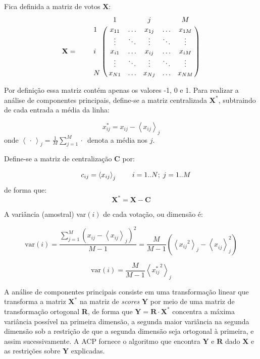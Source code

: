 \documentclass[
	article,			%
	12pt,				%
    twoside,			%
	a4paper,			%
	english,			%
	french,				%
	spanish,			%
	brazil,				%
	]{abntex2}
\newcommand{\tikzmark}[1]{\tikz[overlay, remember picture] \coordinate (#1);}
\let\bbordermatrix\bordermatrix
\begin{document}
Fica definida a matriz de votos $\mathbf{X}$:
\medskip{}
\[
  \mathbf{X} = \qquad \bbordermatrix{~  & \tikzmark{harrowleft} 1 & ~ & j & ~
                        & M\tikzmark{harrowright}  \cr
                    \tikzmark{varrowtop} 
                    1 & x_{11} & \ldots & x_{1j} & \ldots & x_{1M} \cr
                    ~ & \vdots & \ddots & \vdots & \ddots & \vdots \cr
                    i & x_{i1} & \ldots & x_{ij} & \ldots & x_{iM} \cr
                    ~ & \vdots & \ddots & \vdots & \ddots & \vdots \cr
                    \tikzmark{varrowbottom}
                    N & x_{N1} & \ldots & x_{Nj} & \ldots & x_{NM} \cr
                    }
\]

Por definição essa matriz contém apenas os valores -1, 0 e 1. Para realizar a análise de componentes principais, define-se a matriz centralizada $\mathbf{X^{*}}$, subtraindo de cada entrada a média da linha:

\begin{equation}
  x_{ij}^{*} = x_{ij} - \left< x_{ij} \right>_j 
  \label{eq:x-estrela}
\end{equation}
onde $\left< \,\cdot\, \right>_j = \frac{1}{M}\sum_{j=1}^{M} \cdot\,$ denota a média nos $j$.

Define-se a matriz de centralização $\mathbf{C}$ por:

\[
  \begin{array}{r r r r}
    ~ & c_{ij} = \left< x_{ij} \right>_{j} & ~ & i=1..N;\;j=1..M \\
  \end{array}
\]
de forma que:
\[
  \mathbf{X^{*}} = \mathbf{X} - \mathbf{C}
\]

A variância (amostral) var$(i)$ de cada votação, ou dimensão é:

\[
\mathrm{var}(i) = \frac{\sum_{j=1}^M \left( x_{ij} - \left< x_{ij} \right>_j \right)^2 }{M-1}
= \frac{M}{M-1}\left(\left< {x_{ij}}^{2} \right>_{j} - \left< x_{ij}^{~}\right>_{j}^{2} \right)
\]

\begin{equation}
\mathrm{var}(i) = \frac{M}{M-1}\left<{x_{ij}^{*}}^{2}\right>_{j}
\label{eq:variancia}
\end{equation}

A análise de componentes principais consiste em uma transformação linear que transforma a matriz $\mathbf{X^{*}}$ na matriz de \emph{scores} $\mathbf{Y}$ por meio de uma matriz de transformação ortogonal \textbf{R}, de forma que  $\mathbf{Y} = \mathbf{R}\cdot \mathbf{X^{*}}$ concentra a máxima variância possível na primeira dimensão, a segunda maior variância na segunda dimensão sob a restrição de que a segunda dimensão seja ortogonal à primeira, e assim sucessivamente. A ACP fornece o algoritmo que encontra $\mathbf{Y}$ e $\mathbf{R}$ dado $\mathbf{X}$ e as restrições sobre $\mathbf{Y}$ explicadas. 
\end{document}
